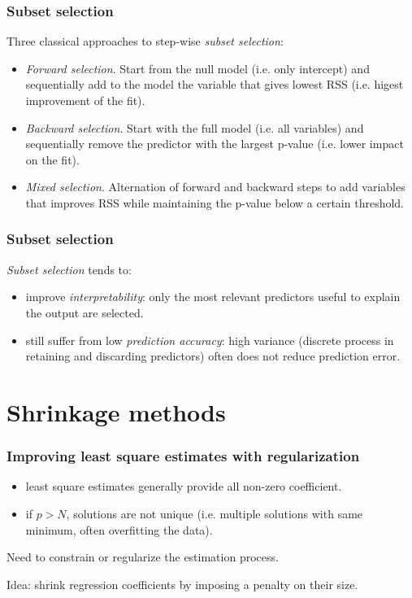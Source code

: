 \documentclass[notes]{beamer}          %
\begin{document}
\begin{frame}
\frametitle{Subset selection}

Three classical approaches to step-wise \textit{subset selection}:

\begin{itemize}
    \item \textit{Forward selection}. Start from the null model (i.e. only intercept) and sequentially add to the model the variable that gives lowest RSS (i.e. higest improvement of the fit).
    \item \textit{Backward selection}. Start with the full model (i.e. all variables) and sequentially remove the predictor with the largest p-value (i.e. lower impact on the fit).
    \item \textit{Mixed selection}. Alternation of forward and backward steps to add variables that improves RSS while maintaining the p-value below a certain threshold.
\end{itemize}

\end{frame}

\begin{frame}
\frametitle{Subset selection}

\textit{Subset selection} tends to:

\begin{itemize}
    \item improve \textit{interpretability}: only the most relevant predictors useful to explain the output are selected.
    \item still suffer from  low \textit{prediction accuracy}: high variance (discrete process in retaining and discarding predictors) often does not reduce prediction error.
\end{itemize}

\end{frame}


\section{Shrinkage methods}

\begin{frame}
\frametitle{Improving least square estimates with regularization}
\begin{itemize}
	\item least square estimates generally provide all non-zero coefficient.
	\item if $p>N$, solutions are not unique (i.e. multiple solutions with same minimum, often overfitting the data).
\end{itemize}


\vspace{5mm} 

Need to constrain or regularize the estimation process.

\vspace{5mm} 

Idea: shrink regression coefficients by imposing a penalty on their size.


\end{frame}
\end{document}
